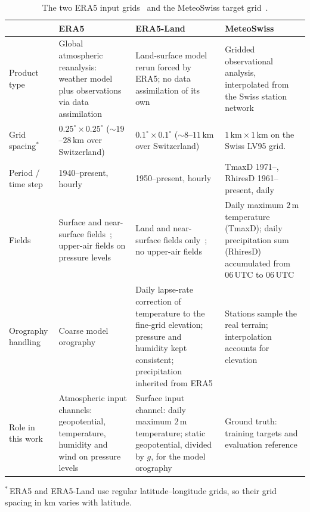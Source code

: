 \begin{table}[htbp]
    \centering
    \caption[Input and target grids]{The two ERA5 input grids~\cite{hersbach2020era5, munozsabater2021era5land} and the MeteoSwiss target grid~\cite{meteoswiss_ogd_grid}.}
    \label{tab:data-grids}
    \footnotesize
    \begin{tabular}{|p{2.2cm}|p{3.5cm}|p{3.5cm}|p{3.5cm}|}
        \hline
        & \textbf{ERA5} & \textbf{ERA5-Land} & \textbf{MeteoSwiss} \\
        \hline
        Product type & Global atmospheric reanalysis: weather model plus observations via data assimilation & Land-surface model rerun forced by ERA5; no data assimilation of its own & Gridded observational analysis, interpolated from the Swiss station network \\
        \hline
        Grid spacing$^{*}$ & $0.25^{\circ} \times 0.25^{\circ}$ (${\sim}19$--$28\,\mathrm{km}$ over Switzerland) & $0.1^{\circ} \times 0.1^{\circ}$ (${\sim}8$--$11\,\mathrm{km}$ over Switzerland) & $1\,\mathrm{km} \times 1\,\mathrm{km}$ on the Swiss LV95 grid.\\
        \hline
        Period / time step & 1940--present, hourly & 1950--present, hourly & TmaxD 1971--, RhiresD 1961--present, daily \\
        \hline
        Fields & Surface and near-surface fields~\cite{era5_single_levels}; upper-air fields on pressure levels~\cite{era5_pressure_levels} & Land and near-surface fields only~\cite{era5land_daily}; no upper-air fields & Daily maximum $2\,\mathrm{m}$ temperature (TmaxD); daily precipitation sum (RhiresD) accumulated from $06\,\mathrm{UTC}$ to $06\,\mathrm{UTC}$\\
        \hline
        Orography handling & Coarse model orography & Daily lapse-rate correction of temperature to the fine-grid elevation; pressure and humidity kept consistent; precipitation inherited from ERA5 & Stations sample the real terrain; interpolation accounts for elevation~\cite{frei2014temperature} \\
        \hline
        Role in this work & Atmospheric input channels: geopotential, temperature, humidity and wind on pressure levels & Surface input channel: daily maximum $2\,\mathrm{m}$ temperature; static geopotential, divided by $g$, for the model orography & Ground truth: training targets and evaluation reference \\
        \hline
    \end{tabular}
    \par\vspace{2pt}
    {\raggedright\scriptsize $^{*}$\,ERA5 and ERA5-Land use regular latitude--longitude grids, so their grid spacing in km varies with latitude.\par}
\end{table}

